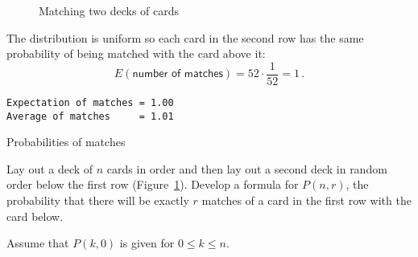 \begin{figure}[tb]
\begin{center}
\end{center}
\caption{Matching two decks of cards}\label{f.cards}
\end{figure}

\solution{}

The distribution is uniform so each card in the second row has the same probability of being matched with the card above it:
\[
E(\textsf{number of matches}) = 52\cdot \frac{1}{52} = 1\,.
\]

\sml{}

\begin{verbatim}
Expectation of matches = 1.00
Average of matches     = 1.01
\end{verbatim}


\begin{prob}{Probabilities of matches}

Lay out a deck of $n$ cards in order and then lay out a second deck in random order below the first row (Figure~\ref{f.cards}). Develop a formula for $P(n,r)$, the probability that there will be exactly $r$ matches of a card in the first row with the card below.

Assume that $P(k,0)$ is given for $0\leq k\leq n$.
\end{prob}

